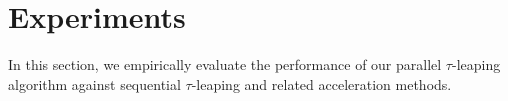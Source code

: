 \documentclass{article}
\newcommand{\NFE}{\mathrm{NFE}}
\begin{document}




\section{Experiments}
\label{sec:exp}
In this section, we empirically evaluate the performance of our parallel $\tau$-leaping algorithm against sequential $\tau$-leaping and related acceleration methods.
\end{document}
